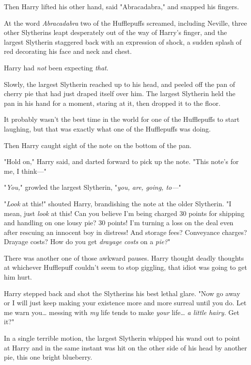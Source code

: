 Then Harry lifted his other hand, said "Abracadabra," and snapped his fingers.

At the word \emph{Abracadabra} two of the Hufflepuffs screamed, including 
Neville, three other Slytherins leapt desperately out of the way of Harry's 
finger, and the largest Slytherin staggered back with an expression of shock, a 
sudden splash of red decorating his face and neck and chest.

Harry had \emph{not} been expecting \emph{that}.

Slowly, the largest Slytherin reached up to his head, and peeled off the pan of 
cherry pie that had just draped itself over him. The largest Slytherin held the 
pan in his hand for a moment, staring at it, then dropped it to the floor.

It probably wasn't the best time in the world for one of the Hufflepuffs to 
start laughing, but that was exactly what one of the Hufflepuffs was doing.

Then Harry caught sight of the note on the bottom of the pan.

"Hold on," Harry said, and darted forward to pick up the note. "This note's for 
me, I think---"

"\emph{You,}" growled the largest Slytherin, "\emph{you, are, going, to---}"

"\emph{Look} at this!" shouted Harry, brandishing the note at the older 
Slytherin. "I mean, just \emph{look} at this! Can you believe I'm being charged 
30 points for shipping and handling on one lousy pie? 30 points! I'm turning a 
loss on the deal even after rescuing an innocent boy in distress! And storage 
fees? Conveyance charges? Drayage costs? How do you get \emph{drayage costs} on 
a \emph{pie?}"

There was another one of those awkward pauses. Harry thought deadly thoughts at 
whichever Hufflepuff couldn't seem to stop giggling, that idiot was going to 
get him hurt.

Harry stepped back and shot the Slytherins his best lethal glare. "Now go away 
or I will just keep making your existence more and more surreal until you do. 
Let me warn you{\ldots} messing with \emph{my} life tends to make \emph{your} 
life{\ldots} \emph{a little hairy.} Get it?"

In a single terrible motion, the largest Slytherin whipped his wand out to 
point at Harry and in the same instant was hit on the other side of his head by 
another pie, this one bright blueberry.

